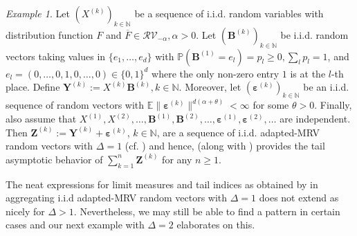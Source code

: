 \documentclass[aos]{imsart}
\numberwithin{equation}{section}
\theoremstyle{plain} %
\theoremstyle{remark}
\newtheorem{example}[theorem]{Example}
\newcommand{\E}{\mathbb{E}}
\newcommand{\N}{\mathbb{N}}
\renewcommand\P{\mathbb{P}}
\newcommand{\VF}[1]{{\color{blue} #1}}
\def\RV{\mathcal{RV}}
\def\bepsilon{\boldsymbol \varepsilon}
\def\bB{\boldsymbol B}
\def\bY{\boldsymbol Y}
\def\bZ{\boldsymbol Z}
\begin{document}
\begin{example}\label{ex:mrvsum:delta1}
Let $(X^{(k)})_{k\in\N}$ be a sequence of i.i.d.  random variables with distribution function $F$ and $\overline{F}\in \RV_{-\alpha}, \alpha>0$. Let $(\bB^{(k)})_{k\in\N}$ be  i.i.d.  random vectors  taking values in $\{e_1,\ldots,e_d\}$ with $\P(\bB^{(1)}=e_l)=p_l\ge 0, \sum_l p_l=1$, and $e_l=(0,\ldots,0,1,0,\ldots,0)  \in \{0,1\}^d$ where the only non-zero entry $1$ is at the $l$-th place. Define $\bY^{(k)}:= X^{(k)}\bB^{(k)}, k\in\N$. Moreover, let $(\bepsilon^{(k)})_{k\in\N}$ be an i.i.d. sequence of random vectors with $\E\|\bepsilon^{(k)}\|^{d(\alpha+\theta)}<\infty$ for some $\theta>0$. Finally, also assume that
 $X^{(1)},X^{(2)},\ldots ,\bB^{(1)},\bB^{(2)},\ldots,\bepsilon^{(1)},\bepsilon^{(2)},\ldots$ are independent.
Then $\bZ^{(k)}:= \bY^{(k)}+\bepsilon^{(k)}$, $k\in\N$, are a sequence of i.i.d. adapted-MRV random vectors with $\Delta=1$ (cf. ) and hence,  (along with ) provides the tail asymptotic behavior of $\sum_{k=1}^n \bZ^{(k)}$ for any $n\ge 1$.
\end{example}

The neat expressions for limit measures and tail indices as obtained by  in aggregating i.i.d adapted-MRV random vectors with $\Delta=1$ does not extend as nicely for $\Delta>1$. Nevertheless, we may still be able to find a pattern in certain cases and our next example with $\Delta=2$ elaborates on this.
\end{document}
